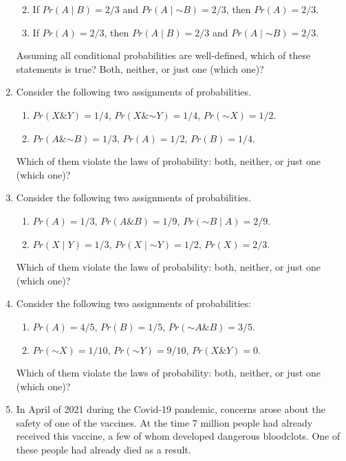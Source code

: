 \documentclass[justified]{tufte-book}
\providecommand{\tightlist}{%
  \setlength{\itemsep}{0pt}\setlength{\parskip}{0pt}}
\newcommand{\given}{\mid}
\renewcommand{\neg}{\mathbin{\sim}}
\renewcommand{\wedge}{\mathbin{\&}}
\newcommand{\p}{Pr}
\theoremstyle{definition}
\theoremstyle{definition}
\theoremstyle{definition}
\theoremstyle{definition}
\theoremstyle{remark}
\begin{document}
\begin{enumerate}
  \begin{enumerate}
  \def\labelenumii{\roman{enumii}.}
  \tightlist
  \item
    If \(\p(A \given B) = 2/3\) and \(\p(A \given \neg B) = 2/3\), then \(\p(A) = 2/3\).
  \item
    If \(\p(A) = 2/3\), then \(\p(A \given B) = 2/3\) and \(\p(A \given \neg B) = 2/3\).
  \end{enumerate}

  Assuming all conditional probabilities are well-defined, which of these statements is true? Both, neither, or just one (which one)?
\item
  Consider the following two assignments of probabilities.

  \begin{enumerate}
  \def\labelenumii{\roman{enumii}.}
  \tightlist
  \item
    \(\p(X \wedge Y) = 1/4\), \(\p(X \wedge \neg Y) = 1/4\), \(\p(\neg X) = 1/2\).
  \item
    \(\p(A \wedge \neg B) = 1/3\), \(\p(A) = 1/2\), \(\p(B) = 1/4\).
  \end{enumerate}

  Which of them violate the laws of probability: both, neither, or just one (which one)?
\item
  Consider the following two assignments of probabilities.

  \begin{enumerate}
  \def\labelenumii{\roman{enumii}.}
  \tightlist
  \item
    \(\p(A) = 1/3\), \(\p(A \wedge B) = 1/9\), \(\p(\neg B \given A) = 2/9\).
  \item
    \(\p(X \given Y) = 1/3\), \(\p(X \given \neg Y) = 1/2\), \(\p(X) = 2/3\).
  \end{enumerate}

  Which of them violate the laws of probability: both, neither, or just one (which one)?
\item
  Consider the following two assignments of probabilities:

  \begin{enumerate}
  \def\labelenumii{\roman{enumii}.}
  \tightlist
  \item
    \(\p(A) = 4/5\), \(\p(B) = 1/5\), \(\p(\neg A \wedge B) = 3/5\).
  \item
    \(\p(\neg X) = 1/10\), \(\p(\neg Y) = 9/10\), \(\p(X \wedge Y) = 0\).
  \end{enumerate}

  Which of them violate the laws of probability: both, neither, or just one (which one)?
\item
  In April of 2021 during the Covid-19 pandemic, concerns arose about the safety of one of the vaccines. At the time \(7\) million people had already received this vaccine, a few of whom developed dangerous bloodclots. One of these people had already died as a result.


\end{enumerate}
\end{document}
